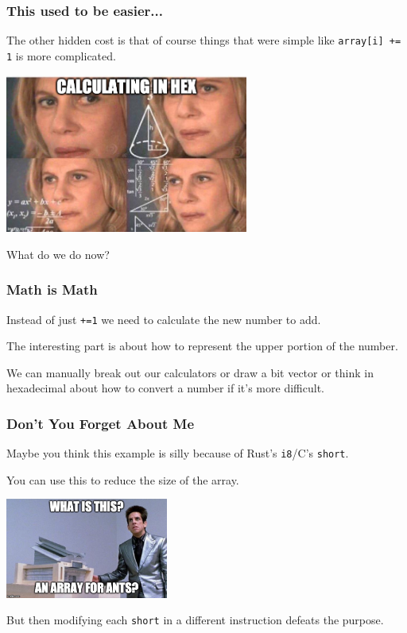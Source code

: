 \begin{frame}
\frametitle{This used to be easier...}

The other hidden cost is that of course things that were simple like \texttt{array[i] += 1} is more complicated. 

\begin{center}
	\includegraphics[width=0.6\textwidth]{images/hex.jpg}
\end{center}

What do we do now?

\end{frame}


\begin{frame}
\frametitle{Math is Math}

Instead of just \texttt{+=1} we need to calculate the new number to add. 

The interesting part is about how to represent the upper portion of the number.

We can manually break out our calculators or draw a bit vector or think in hexadecimal about how to convert a number if it's more difficult.


\end{frame}

\begin{frame}
\frametitle{Don't You Forget About Me}

Maybe you think this example is silly because of  Rust's \texttt{i8}/C's \texttt{short}.

You can use this to reduce the size of the array.

\begin{center}
	\includegraphics[width=0.4\textwidth]{images/arrayforants.jpg}
\end{center}

But then modifying each \texttt{short} in a different instruction defeats the purpose.

\end{frame}


